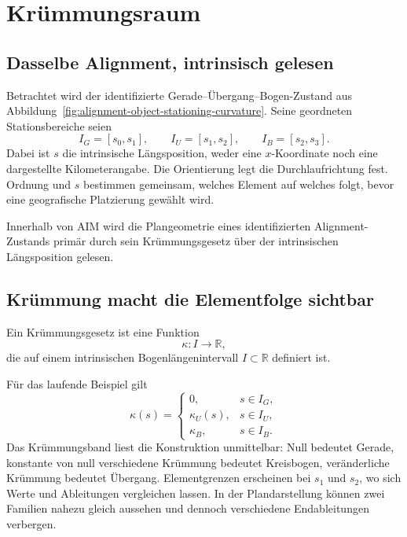 
\chapter{Krümmungsraum}
\label{chap:curvature-space}

\section*{Dasselbe Alignment, intrinsisch gelesen}

Betrachtet wird der identifizierte Gerade--Übergang--Bogen-Zustand aus
Abbildung~\ref{fig:alignment-object-stationing-curvature}. Seine geordneten
Stationsbereiche seien
\[
I_G=[s_0,s_1],\qquad I_U=[s_1,s_2],\qquad I_B=[s_2,s_3].
\]
Dabei ist $s$ die intrinsische Längsposition, weder eine $x$-Koordinate
noch eine dargestellte Kilometerangabe. Die Orientierung legt die
Durchlaufrichtung fest. Ordnung und $s$ bestimmen gemeinsam, welches
Element auf welches folgt, bevor eine geografische Platzierung gewählt wird.

\begin{principle}[Krümmungsraumprinzip]
\label{princ:curvature-space}
Innerhalb von AIM wird die Plangeometrie eines identifizierten
Alignment-Zustands primär durch sein Krümmungsgesetz über der intrinsischen
Längsposition gelesen.
\end{principle}

\section{Krümmung macht die Elementfolge sichtbar}

\begin{definition}[Krümmungsgesetz]
\label{def:curvature-law}
Ein Krümmungsgesetz ist eine Funktion
\[
\kappa:I\to\mathbb R,
\]
die auf einem intrinsischen Bogenlängenintervall
$I\subset\mathbb R$ definiert ist.
\end{definition}

Für das laufende Beispiel gilt
\[
\kappa(s)=
\begin{cases}
0, & s\in I_G,\\
\kappa_U(s), & s\in I_U,\\
\kappa_B, & s\in I_B.
\end{cases}
\label{eq:straight-transition-arc-curvature}
\]
Das Krümmungsband liest die Konstruktion unmittelbar: Null bedeutet Gerade,
konstante von null verschiedene Krümmung bedeutet Kreisbogen, veränderliche
Krümmung bedeutet Übergang. Elementgrenzen erscheinen bei $s_1$ und $s_2$,
wo sich Werte und Ableitungen vergleichen lassen. In der Plandarstellung
können zwei Familien nahezu gleich aussehen und dennoch verschiedene
Endableitungen verbergen.

